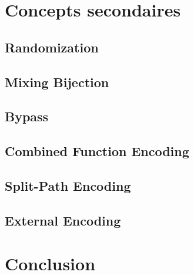 \documentclass{beamer}
\begin{document}
\section{Concepts secondaires}

\subsection{Randomization}

\subsection{Mixing Bijection}

\subsection{Bypass}

\subsection{Combined Function Encoding}

\subsection{Split-Path Encoding}

\subsection{External Encoding}

\section{Conclusion}
\end{document}
